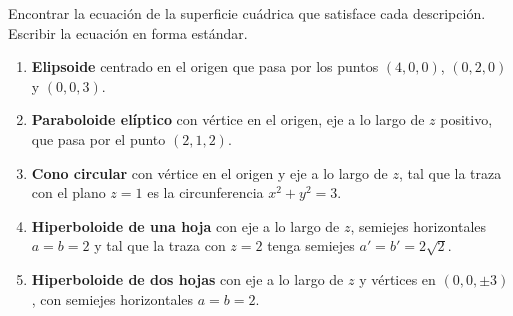 Encontrar la ecuación de la superficie cuádrica que satisface cada descripción. Escribir la ecuación en forma estándar.
\begin{enumerate}
    \item \textbf{Elipsoide} centrado en el origen que pasa por los puntos $(4, 0, 0)$, $(0, 2, 0)$ y $(0, 0, 3)$.
    \item \textbf{Paraboloide elíptico} con vértice en el origen, eje a lo largo de $z$ positivo, que pasa por el punto $(2, 1, 2)$.
    \item \textbf{Cono circular} con vértice en el origen y eje a lo largo de $z$, tal que la traza con el plano $z = 1$ es la circunferencia $x^2 + y^2 = 3$.
    \item \textbf{Hiperboloide de una hoja} con eje a lo largo de $z$, semiejes horizontales $a = b = 2$ y tal que la traza con $z = 2$ tenga semiejes $a' = b' = 2\sqrt{2}$.
    \item \textbf{Hiperboloide de dos hojas} con eje a lo largo de $z$ y vértices en $(0, 0, \pm 3)$, con semiejes horizontales $a = b = 2$.
\end{enumerate}